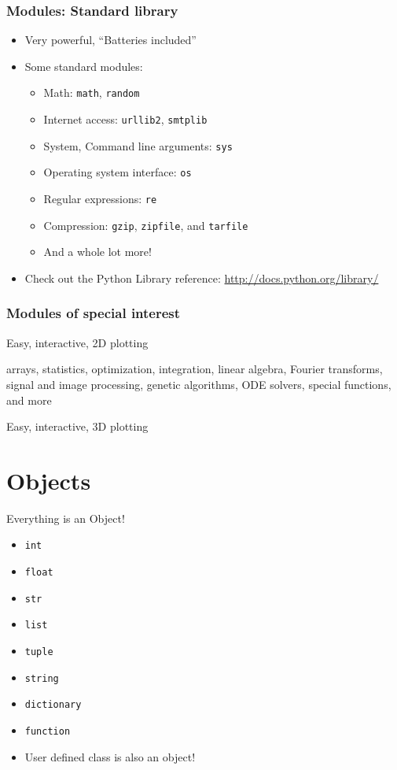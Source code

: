 \documentclass[14pt,compress]{beamer}
\newcounter{time}
\newcommand{\inctime}[1]{\addtocounter{time}{#1}{\tiny \thetime\ m}}
\newcommand{\typ}[1]{\lstinline{#1}}
\begin{document}
\begin{frame}
  \frametitle{Modules: Standard library}
  \begin{itemize}
  \item Very powerful, ``Batteries included''
  \item Some standard modules:
    \begin{itemize}
    \item Math: \typ{math}, \typ{random}
    \item Internet access: \typ{urllib2}, \typ{smtplib}
    \item System, Command line arguments: \typ{sys}
    \item Operating system interface: \typ{os}
    \item Regular expressions: \typ{re}
    \item Compression: \typ{gzip}, \typ{zipfile}, and \typ{tarfile}
    \item And a whole lot more!
    \end{itemize}
  \item Check out the Python Library reference:
    \url{http://docs.python.org/library/}
  \end{itemize}
\inctime{5}
\end{frame}

\begin{frame}[fragile]
  \frametitle{Modules of special interest}
  \begin{description}[matplotlibfor2d]
    \item[\texttt{pylab}] Easy, interactive, 2D plotting

    \item[\texttt{scipy}] arrays, statistics, optimization, integration, linear
            algebra, Fourier transforms, signal and image processing,
            genetic algorithms, ODE solvers, special functions, and more

    \item[\texttt{Mayavi}] Easy, interactive, 3D plotting
  \end{description}
\end{frame}

\section{Objects}
\begin{frame}{Everything is an Object!}
  \begin{itemize}
    \item \typ{int}
    \item \typ{float}
    \item \typ{str}
    \item \typ{list}
    \item \typ{tuple}
    \item \typ{string}
    \item \typ{dictionary}
    \item \typ{function}
    \item User defined class is also an object!
  \end{itemize}
\end {frame}
\end{document}
